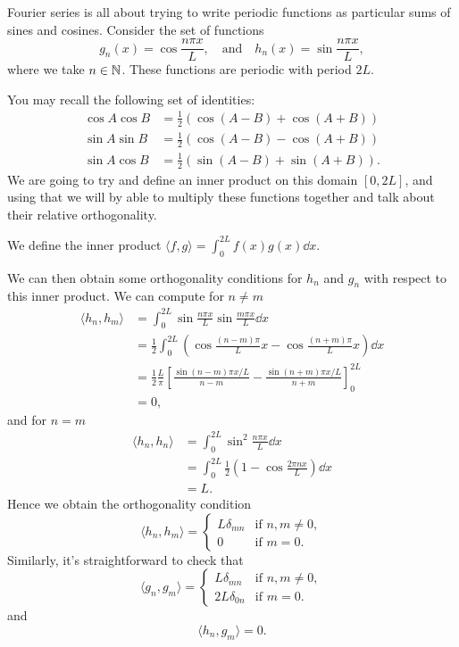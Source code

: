 \documentclass[a4paper]{scrartcl}
\begin{document}
Fourier series is all about trying to write periodic functions as particular sums of sines and cosines.
Consider the set of functions
$$
g_n(x) = \cos \frac{n \pi x}{L}, \quad \text{and} \quad h_n(x) = \sin \frac{n \pi x}{L},
$$
where we take $n \in \mathbb{N}$.  These functions are periodic with period $2L$.

You may recall the following set of identities:
\begin{align*}
    \cos A \cos B &= \frac{1}{2}\left(\cos(A - B) + \cos(A + B)\right) \\
    \sin A \sin B &= \frac{1}{2}\left(\cos(A - B) - \cos(A + B)\right) \\
    \sin A \cos B &= \frac{1}{2}\left(\sin(A - B) + \sin(A + B)\right).
\end{align*}
We are going to try and define an inner product on this domain $[0, 2L]$, and using that we will by able to multiply these functions together and talk about their relative orthogonality.

\begin{definition}
    We define the inner product
    $\langle f, g \rangle = \int_0^{2L} f(x) g(x) \dd x$.
\end{definition}

We can then obtain some orthogonality conditions for $h_n$ and $g_n$ with respect to this inner product. We can compute for $n \neq m$
\begin{align*}
    \langle h_n, h_m \rangle &= \int_0^{2L} \sin \frac{n \pi x}{L} \sin \frac{m \pi x}{L} \dd x \\
    &= \frac{1}{2}\int_0^{2L} \left(\cos \frac{(n -m) \pi }{L}x - \cos \frac{(n + m )\pi}{L} x\right) \dd x \\
    &= \frac{1}{2} \frac{L}{\pi}\left[\frac{\sin (n - m) \pi x /L}{n - m} - \frac{\sin (n + m) \pi x /L}{n + m}\right]_0^{2L} \\
    &= 0,
\end{align*}
and for $n = m$
\begin{align*}
    \langle h_n, h_n \rangle &= \int_0^{2L} \sin^2 \frac{n \pi x}{L} \dd x \\
                             &= \int_0^{2L} \frac{1}{2}\left(1 - \cos \frac{2 \pi n x}{L}\right) \dd x \\
                             &= L.
\end{align*}
Hence we obtain the orthogonality condition
$$
\langle h_n, h_m \rangle = \begin{cases}
    L \delta_{mn} &\mbox{if } n, m \neq 0, \\
    0 &\mbox{if } m = 0.
   \end{cases}
$$
Similarly, it's straightforward to check that
$$
\langle g_n, g_m \rangle = \begin{cases}
    L \delta_{mn} &\mbox{if } n, m \neq 0, \\
    2L \delta_{0n} &\mbox{if } m = 0.
   \end{cases}
$$
and
$$
\langle h_n, g_m \rangle = 0.
$$
\end{document}
